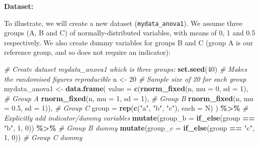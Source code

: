 \documentclass[
  12pt,
]{krantz}
\newenvironment{Shaded}{\begin{snugshade}}{\end{snugshade}}
\newcommand{\CommentTok}[1]{\textcolor[rgb]{0.56,0.35,0.01}{\textit{#1}}}
\newcommand{\DataTypeTok}[1]{\textcolor[rgb]{0.13,0.29,0.53}{#1}}
\newcommand{\DecValTok}[1]{\textcolor[rgb]{0.00,0.00,0.81}{#1}}
\newcommand{\FloatTok}[1]{\textcolor[rgb]{0.00,0.00,0.81}{#1}}
\newcommand{\KeywordTok}[1]{\textcolor[rgb]{0.13,0.29,0.53}{\textbf{#1}}}
\newcommand{\NormalTok}[1]{#1}
\newcommand{\OperatorTok}[1]{\textcolor[rgb]{0.81,0.36,0.00}{\textbf{#1}}}
\newcommand{\StringTok}[1]{\textcolor[rgb]{0.31,0.60,0.02}{#1}}
\begin{document}
\textbf{Dataset:}

To illustrate, we will create a new dataset (\texttt{mydata\_anova1}). We assume three groups (A, B and C) of normally-distributed variables, with means of 0, 1 and 0.5 respectively. We also create dummy variables for groups B and C (group A is our reference group, and so does not require an indicator):

\begin{Shaded}
\begin{Highlighting}[]
\CommentTok{\# Create dataset \textquotesingle{}mydata\_anova1\textquotesingle{} which is three groups:}
\KeywordTok{set.seed}\NormalTok{(}\DecValTok{40}\NormalTok{)                      }\CommentTok{\# Makes the randomised figures reproducible}
\NormalTok{n \textless{}{-}}\StringTok{ }\DecValTok{20}                           \CommentTok{\# Sample size of 20 for each group}
\NormalTok{mydata\_anova1 \textless{}{-}}\StringTok{ }\KeywordTok{data.frame}\NormalTok{(}
                    \DataTypeTok{value =} \KeywordTok{c}\NormalTok{(}\KeywordTok{rnorm\_fixed}\NormalTok{(n, }\DataTypeTok{mu =} \DecValTok{0}\NormalTok{, }\DataTypeTok{sd =} \DecValTok{1}\NormalTok{),     }\CommentTok{\# Group A}
                              \KeywordTok{rnorm\_fixed}\NormalTok{(n, }\DataTypeTok{mu =} \DecValTok{1}\NormalTok{, }\DataTypeTok{sd =} \DecValTok{1}\NormalTok{),    }\CommentTok{\# Group B}
                              \KeywordTok{rnorm\_fixed}\NormalTok{(n, }\DataTypeTok{mu =} \FloatTok{0.5}\NormalTok{, }\DataTypeTok{sd =} \DecValTok{1}\NormalTok{)), }\CommentTok{\# Group C}
                    \DataTypeTok{group =} \KeywordTok{rep}\NormalTok{(}\KeywordTok{c}\NormalTok{(}\StringTok{"a"}\NormalTok{, }\StringTok{"b"}\NormalTok{, }\StringTok{"c"}\NormalTok{), }\DataTypeTok{each =}\NormalTok{ N)}
\NormalTok{                    ) }\OperatorTok{\%\textgreater{}\%}
\StringTok{  }\CommentTok{\# Explicitly add indicator/dummy variables}
\StringTok{  }\KeywordTok{mutate}\NormalTok{(}\DataTypeTok{group\_b =} \KeywordTok{if\_else}\NormalTok{(group }\OperatorTok{==}\StringTok{ "b"}\NormalTok{, }\DecValTok{1}\NormalTok{, }\DecValTok{0}\NormalTok{)) }\OperatorTok{\%\textgreater{}\%}\StringTok{             }\CommentTok{\# Group B dummy}
\StringTok{  }\KeywordTok{mutate}\NormalTok{(}\DataTypeTok{group\_c =} \KeywordTok{if\_else}\NormalTok{(group }\OperatorTok{==}\StringTok{ "c"}\NormalTok{, }\DecValTok{1}\NormalTok{, }\DecValTok{0}\NormalTok{))                 }\CommentTok{\# Group C dummy}
\end{Highlighting}
\end{Shaded}
\end{document}
